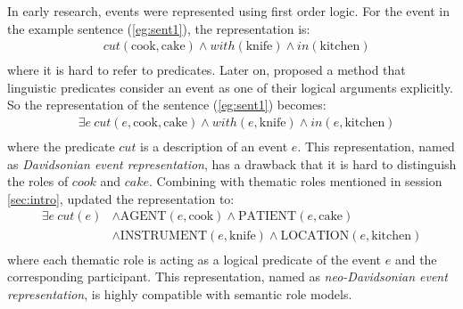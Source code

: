 \documentclass[a4paper]{article}
\begin{document}
In early research, events were represented using first order logic. For the event in the example sentence (\ref{eg:sent1}), the representation is:
\begin{equation*} \label{eg:fol}
\begin{aligned}
    & cut(\text{cook}, \text{cake}) \land with(\text{knife}) \land in(\text{kitchen}) \\
\end{aligned}
\end{equation*}
where it is hard to refer to predicates. Later on, \citet{davidson1967logical} proposed a method that linguistic predicates consider an event as one of their logical arguments explicitly. So the representation of the sentence (\ref{eg:sent1}) becomes: 
\begin{equation*} \label{eg:davidsonian}
\begin{aligned}
    & \exists e\ cut(e, \text{cook}, \text{cake}) \land with(e, \text{knife}) \land in(e, \text{kitchen}) \\
\end{aligned}
\end{equation*}
where the predicate $cut$ is a description of an event $e$. This representation, named as \textit{Davidsonian event representation}, has a drawback that it is hard to distinguish the roles of $cook$ and $cake$. Combining with thematic roles mentioned in session \ref{sec:intro}, \citet{parsons1990events} updated the representation to: 
\begin{equation} \label{eg:neodavidsonian}
\begin{aligned}
    \exists e\ cut(e)
    & \land \text{AGENT}(e, \text{cook}) \land \text{PATIENT}(e, \text{cake}) \\
    & \land \text{INSTRUMENT}(e, \text{knife}) \land \text{LOCATION}(e, \text{kitchen}) \\
\end{aligned}
\end{equation}
where each thematic role is acting as a logical predicate of the event $e$ and the corresponding participant. This representation, named as \textit{neo-Davidsonian event representation}, is highly compatible with semantic role models. 
% 
% 
\end{document}
